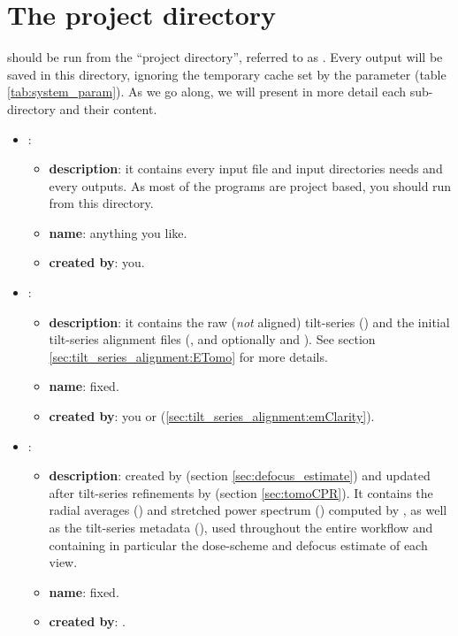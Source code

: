 \section{The project directory} \label{sec:project_directory}

{\emClarity} should be run from the ``project directory'', referred to as . Every output will be saved in this directory, ignoring the temporary cache set by the  parameter (table \ref{tab:system_param}). As we go along, we will present in more detail each sub-directory and their content.

\begin{itemize}
    \item {}:
    \begin{itemize}
        \item \textbf{description}: it contains every input file and input directories {\emClarity} needs and every outputs. As most of the {\emClarity} programs are project based, you should run {\emClarity} from this directory.
        \item \textbf{name}: anything you like.
        \item \textbf{created by}: you.
    \end{itemize}

    \item {}:
    \begin{itemize}
        \item \textbf{description}: it contains the raw (\textit{not} aligned) tilt-series () and the initial tilt-series alignment files (,  and optionally  and ). See section \ref{sec:tilt_series_alignment:ETomo} for more details.
        \item \textbf{name}: fixed.
        \item \textbf{created by}: you or {\emClarity}  (\ref{sec:tilt_series_alignment:emClarity}).
    \end{itemize}

     \item {}:
     \begin{itemize}
        
        \item \textbf{description}: created by  (section \ref{sec:defocus_estimate}) and updated after tilt-series refinements by  (section \ref{sec:tomoCPR}). It contains the radial averages () and stretched power spectrum () computed by , as well as the tilt-series metadata (), used throughout the entire workflow and containing in particular the dose-scheme and defocus estimate of each view.
        \item \textbf{name}: fixed.
        \item \textbf{created by}: {\emClarity} .
    \end{itemize}


\end{itemize}
